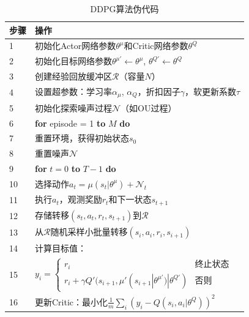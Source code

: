 \begin{table}[t]
\centering
\caption{DDPG算法伪代码}
\label{tab:ddpg}
\begin{tabular}{lp{}}
\toprule
\textnormal{步骤} & \textnormal{操作} \\
\midrule
1 & 初始化Actor网络参数$\theta^\mu$和Critic网络参数$\theta^Q$ \\
2 & 初始化目标网络参数$\theta^{\mu'} \leftarrow \theta^\mu$, $\theta^{Q'} \leftarrow \theta^Q$ \\
3 & 创建经验回放缓冲区$\mathcal{R}$（容量$N$） \\
  
4 & 设置超参数：学习率$\alpha_\mu$, $\alpha_Q$，折扣因子$\gamma$，软更新系数$\tau$ \\
5 & 初始化探索噪声过程$\mathcal{N}$（如OU过程） \\
  
6 & \textbf{for} episode = 1 \textbf{to} $M$ \textbf{do} \\
  
7 & \quad 重置环境，获得初始状态$s_0$ \\
8 & \quad 重置噪声$\mathcal{N}$ \\
  
9 & \quad \textbf{for} $t = 0$ \textbf{to} $T-1$ \textbf{do} \\
  
10 & \qquad 选择动作$a_t = \mu(s_t|\theta^\mu) + \mathcal{N}_t$ \\
  
11 & \qquad 执行$a_t$，观测奖励$r_t$和下一状态$s_{t+1}$ \\
  
12 & \qquad 存储转移$(s_t, a_t, r_t, s_{t+1})$到$\mathcal{R}$ \\
  
13 & \qquad 从$\mathcal{R}$随机采样小批量转移$(s_i, a_i, r_i, s_{i+1})$ \\
  
14 & \qquad 计算目标值： \\
15  & \qquad $y_i = \begin{cases} 
  r_i & \text{终止状态} \\
  r_i + \gamma Q'(s_{i+1}, \mu'(s_{i+1}|\theta^{\mu'})|\theta^{Q'}) & \text{否则}
  \end{cases}$ \\
  
16 & \qquad 更新Critic：最小化$\frac{1}{m}\sum_i (y_i - Q(s_i,a_i|\theta^Q))^2$ \\
  

\end{tabular}
\end{table}
